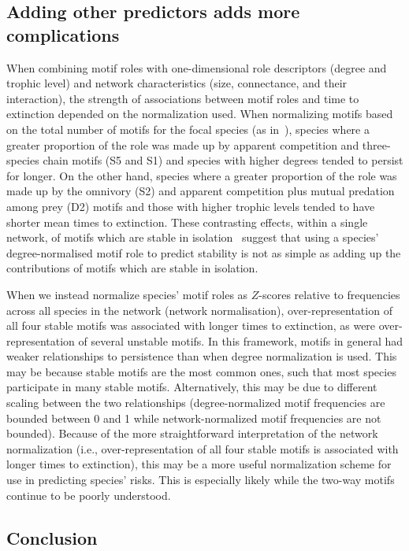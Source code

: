 \documentclass[12pt]{article}
\begin{document}
	\subsection*{Adding other predictors adds more complications}

		When combining motif roles with one-dimensional role descriptors (degree and trophic level) and network characteristics (size, connectance, and their interaction), the strength of associations between motif roles and time to extinction depended on the normalization used.
		When normalizing motifs based on the total number of motifs for the focal species (as in~\citet{Stouffer2012,Cirtwill2015}), species where a greater proportion of the role was made up by apparent competition and three-species chain motifs (S5 and S1) and species with higher degrees tended to persist for longer.
		On the other hand, species where a greater proportion of the role was made up by the omnivory (S2) and apparent competition plus mutual predation among prey (D2) motifs and those with higher trophic levels tended to have shorter mean times to extinction.
		These contrasting effects, within a single network, of motifs which are stable in isolation~\citep{Borrelli2015a} suggest that using a species' degree-normalised motif role to predict stability is not as simple as adding up the contributions of motifs which are stable in isolation.


		When we instead normalize species' motif roles as $Z$-scores relative to frequencies across all species in the network (network normalisation), over-representation of all four stable motifs was associated with longer times to extinction, as were over-representation of several unstable motifs.
		In this framework, motifs in general had weaker relationships to persistence than when degree normalization is used. 
		This may be because stable motifs are the most common ones, such that most species participate in many stable motifs.
		Alternatively, this may be due to different scaling between the two relationships (degree-normalized motif frequencies are bounded between 0 and 1 while network-normalized motif frequencies are not bounded).
		Because of the more straightforward interpretation of the network normalization (i.e., over-representation of all four stable motifs is associated with longer times to extinction), this may be a more useful normalization scheme for use in predicting species' risks.
		This is especially likely while the two-way motifs continue to be poorly understood.

	
	\subsection*{Conclusion}	
\end{document}
